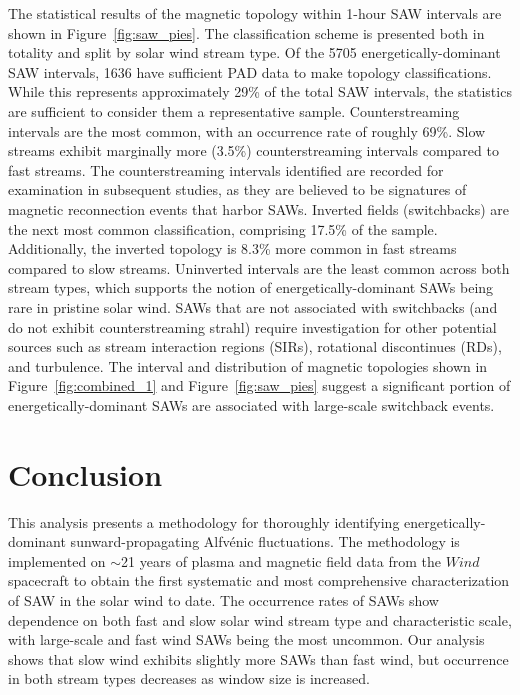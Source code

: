 \documentclass[twocolumn, times]{aastex631}
\begin{document}
The statistical results of the magnetic topology within 1-hour SAW intervals are shown in Figure~\ref{fig:saw_pies}. The classification scheme is presented both in totality and split by solar wind stream type. Of the 5705 energetically-dominant SAW intervals, 1636 have sufficient PAD data to make topology classifications. While this represents approximately 29\% of the total SAW intervals, the statistics are sufficient to consider them a representative sample. Counterstreaming intervals are the most common, with an occurrence rate of roughly 69\%. Slow streams exhibit marginally more (3.5\%) counterstreaming intervals compared to fast streams. The counterstreaming intervals identified are recorded for examination in subsequent studies, as they are believed to be signatures of magnetic reconnection events that harbor SAWs. Inverted fields (switchbacks) are the next most common classification, comprising 17.5\% of the sample. Additionally, the inverted topology is 8.3\% more common in fast streams compared to slow streams. Uninverted intervals are the least common across both stream types, which supports the notion of energetically-dominant SAWs being rare in pristine solar wind. SAWs that are not associated with switchbacks (and do not exhibit counterstreaming strahl) require investigation for other potential sources such as stream interaction regions (SIRs), rotational discontinues (RDs), and turbulence. The interval and distribution of magnetic topologies shown in Figure~\ref{fig:combined_1} and Figure~\ref{fig:saw_pies} suggest a significant portion of energetically-dominant SAWs are associated with large-scale switchback events.

\section{Conclusion} \label{sec:conclusion}
This analysis presents a methodology for thoroughly identifying energetically-dominant sunward-propagating Alfv\'enic fluctuations. The methodology is implemented on $\sim$21 years of plasma and magnetic field data from the $Wind$ spacecraft to obtain the first systematic and most comprehensive characterization of SAW in the solar wind to date. The occurrence rates of SAWs show dependence on both fast and slow solar wind stream type and characteristic scale, with large-scale and fast wind SAWs being the most uncommon. Our analysis shows that slow wind exhibits slightly more SAWs than fast wind, but occurrence in both stream types decreases as window size is increased.
\end{document}
